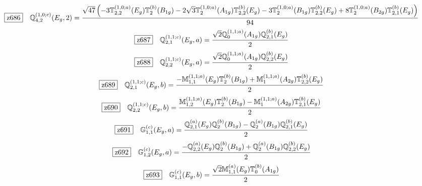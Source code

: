 \documentclass[fleqn,10pt,landscape]{jsarticle}
\begin{document}
\begin{dmath*}
\hspace*{3mm}\fbox{z686}\quad \mathbb{Q}_{4,2}^{(1,0;c)}(E_{g},2)=\frac{\sqrt{47} \left(- 3 \mathbb{T}_{2,2}^{(1,0;a)}(E_{g}) \mathbb{T}_{2}^{(b)}(B_{1g}) - 2 \sqrt{3} \mathbb{T}_{2}^{(1,0;a)}(A_{1g}) \mathbb{T}_{2,2}^{(b)}(E_{g}) - 3 \mathbb{T}_{2}^{(1,0;a)}(B_{1g}) \mathbb{T}_{2,2}^{(b)}(E_{g}) + 8 \mathbb{T}_{2}^{(1,0;a)}(B_{2g}) \mathbb{T}_{2,1}^{(b)}(E_{g})\right)}{94}
\end{dmath*}
\begin{dmath*}
\hspace*{3mm}\fbox{z687}\quad \mathbb{Q}_{2,1}^{(1,1;c)}(E_{g},a)=\frac{\sqrt{2} \mathbb{Q}_{0}^{(1,1;a)}(A_{1g}) \mathbb{Q}_{2,1}^{(b)}(E_{g})}{2}
\end{dmath*}
\begin{dmath*}
\hspace*{3mm}\fbox{z688}\quad \mathbb{Q}_{2,2}^{(1,1;c)}(E_{g},a)=\frac{\sqrt{2} \mathbb{Q}_{0}^{(1,1;a)}(A_{1g}) \mathbb{Q}_{2,2}^{(b)}(E_{g})}{2}
\end{dmath*}
\begin{dmath*}
\hspace*{3mm}\fbox{z689}\quad \mathbb{Q}_{2,1}^{(1,1;c)}(E_{g},b)=\frac{- \mathbb{M}_{1,1}^{(1,1;a)}(E_{g}) \mathbb{T}_{2}^{(b)}(B_{1g}) + \mathbb{M}_{1}^{(1,1;a)}(A_{2g}) \mathbb{T}_{2,2}^{(b)}(E_{g})}{2}
\end{dmath*}
\begin{dmath*}
\hspace*{3mm}\fbox{z690}\quad \mathbb{Q}_{2,2}^{(1,1;c)}(E_{g},b)=\frac{\mathbb{M}_{1,2}^{(1,1;a)}(E_{g}) \mathbb{T}_{2}^{(b)}(B_{1g}) - \mathbb{M}_{1}^{(1,1;a)}(A_{2g}) \mathbb{T}_{2,1}^{(b)}(E_{g})}{2}
\end{dmath*}
\begin{dmath*}
\hspace*{3mm}\fbox{z691}\quad \mathbb{G}_{1,1}^{(c)}(E_{g},a)=\frac{\mathbb{Q}_{2,1}^{(a)}(E_{g}) \mathbb{Q}_{2}^{(b)}(B_{1g}) - \mathbb{Q}_{2}^{(a)}(B_{1g}) \mathbb{Q}_{2,1}^{(b)}(E_{g})}{2}
\end{dmath*}
\begin{dmath*}
\hspace*{3mm}\fbox{z692}\quad \mathbb{G}_{1,2}^{(c)}(E_{g},a)=\frac{- \mathbb{Q}_{2,2}^{(a)}(E_{g}) \mathbb{Q}_{2}^{(b)}(B_{1g}) + \mathbb{Q}_{2}^{(a)}(B_{1g}) \mathbb{Q}_{2,2}^{(b)}(E_{g})}{2}
\end{dmath*}
\begin{dmath*}
\hspace*{3mm}\fbox{z693}\quad \mathbb{G}_{1,1}^{(c)}(E_{g},b)=\frac{\sqrt{2} \mathbb{M}_{1,1}^{(a)}(E_{g}) \mathbb{T}_{0}^{(b)}(A_{1g})}{2}
\end{dmath*}
\end{document}
